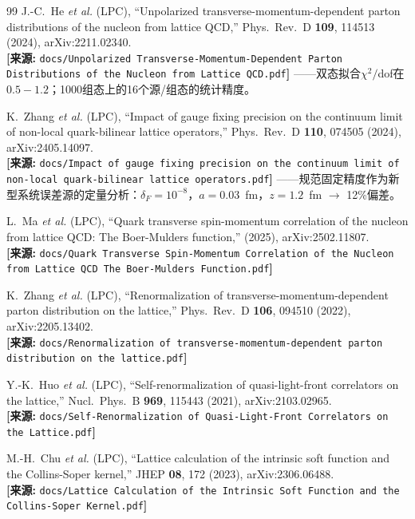 \documentclass[12pt,a4paper]{ctexart}
\begin{document}
\begin{thebibliography}{99}
J.-C.~He \textit{et al.} (LPC),
``Unpolarized transverse-momentum-dependent parton distributions of the nucleon from lattice QCD,''
Phys.\ Rev.\ D \textbf{109}, 114513 (2024), arXiv:2211.02340.
\\\textbf{[来源:} \texttt{docs/Unpolarized Transverse-Momentum-Dependent Parton Distributions of the Nucleon from Lattice QCD.pdf}\textbf{]}
——双态拟合$\chi^2/$dof在$0.5-1.2$；1000组态上的16个源/组态的统计精度。

K.~Zhang \textit{et al.} (LPC),
``Impact of gauge fixing precision on the continuum limit of non-local quark-bilinear lattice operators,''
Phys.\ Rev.\ D \textbf{110}, 074505 (2024), arXiv:2405.14097.
\\\textbf{[来源:} \texttt{docs/Impact of gauge fixing precision on the continuum limit of non-local quark-bilinear lattice operators.pdf}\textbf{]}
——规范固定精度作为新型系统误差源的定量分析：$\delta_F = 10^{-8}$，$a=0.03$~fm，$z=1.2$~fm $\to$ 12\%偏差。

L.~Ma \textit{et al.} (LPC),
``Quark transverse spin-momentum correlation of the nucleon from lattice QCD: The Boer-Mulders function,''
(2025), arXiv:2502.11807.
\\\textbf{[来源:} \texttt{docs/Quark Transverse Spin-Momentum Correlation of the Nucleon from Lattice QCD The Boer-Mulders Function.pdf}\textbf{]}

K.~Zhang \textit{et al.} (LPC),
``Renormalization of transverse-momentum-dependent parton distribution on the lattice,''
Phys.\ Rev.\ D \textbf{106}, 094510 (2022), arXiv:2205.13402.
\\\textbf{[来源:} \texttt{docs/Renormalization of transverse-momentum-dependent parton distribution on the lattice.pdf}\textbf{]}

Y.-K.~Huo \textit{et al.} (LPC),
``Self-renormalization of quasi-light-front correlators on the lattice,''
Nucl.\ Phys.\ B \textbf{969}, 115443 (2021), arXiv:2103.02965.
\\\textbf{[来源:} \texttt{docs/Self-Renormalization of Quasi-Light-Front Correlators on the Lattice.pdf}\textbf{]}

M.-H.~Chu \textit{et al.} (LPC),
``Lattice calculation of the intrinsic soft function and the Collins-Soper kernel,''
JHEP \textbf{08}, 172 (2023), arXiv:2306.06488.
\\\textbf{[来源:} \texttt{docs/Lattice Calculation of the Intrinsic Soft Function and the Collins-Soper Kernel.pdf}\textbf{]}


\end{thebibliography}
\end{document}
